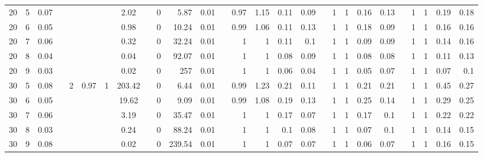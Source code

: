 \documentclass[11pt]{article}
\begin{document}
\begin{table}
\begin{adjustbox}{width=\columnwidth, height=0.3\textheight, center}
\begin{tabular}{rrrrccccrrrrrrrrrrrrrrrrrrr}
			\midrule
			20    & 5     & 0.07  &       &       &       &       & 2.02  &       & 0     & 5.87  & 0.01  &       & 0.97  & 1.15  & 0.11  & 0.09  &       & 1     & 1     & 0.16  & 0.13  &       & 1     & 1     & 0.19  & 0.18 \\
			20    & 6     & 0.05  &       &       &       &       & 0.98  &       & 0     & 10.24 & 0.01  &       & 0.99  & 1.06  & 0.11  & 0.13  &       & 1     & 1     & 0.18  & 0.09  &       & 1     & 1     & 0.16  & 0.16 \\
			20    & 7     & 0.06  &       &       &       &       & 0.32  &       & 0     & 32.24 & 0.01  &       & 1     & 1     & 0.11  & 0.1   &       & 1     & 1     & 0.09  & 0.09  &       & 1     & 1     & 0.14  & 0.16 \\
			20    & 8     & 0.04  &       &       &       &       & 0.04  &       & 0     & 92.07 & 0.01  &       & 1     & 1     & 0.08  & 0.09  &       & 1     & 1     & 0.08  & 0.08  &       & 1     & 1     & 0.11  & 0.13 \\
			20    & 9     & 0.03  &       &       &       &       & 0.02  &       & 0     & 257   & 0.01  &       & 1     & 1     & 0.06  & 0.04  &       & 1     & 1     & 0.05  & 0.07  &       & 1     & 1     & 0.07  & 0.1 \\
			\midrule
			30    & 5     & 0.08  &       & 2     & 0.97  & 1     & 203.42  &       & 0     & 6.44  & 0.01  &       & 0.99  & 1.23  & 0.21  & 0.11  &       & 1     & 1     & 0.21  & 0.21  &       & 1     & 1     & 0.45  & 0.27 \\
			30    & 6     & 0.05  &       &       &       &       & 19.62  &       & 0     & 9.09  & 0.01  &       & 0.99  & 1.08  & 0.19  & 0.13  &       & 1     & 1     & 0.25  & 0.14  &       & 1     & 1     & 0.29  & 0.25 \\
			30    & 7     & 0.06  &       &       &       &       & 3.19  &       & 0     & 35.47 & 0.01  &       & 1     & 1     & 0.17  & 0.07  &       & 1     & 1     & 0.17  & 0.1   &       & 1     & 1     & 0.22  & 0.22 \\
			30    & 8     & 0.03  &       &       &       &       & 0.24  &       & 0     & 88.24 & 0.01  &       & 1     & 1     & 0.1   & 0.08  &       & 1     & 1     & 0.07  & 0.1   &       & 1     & 1     & 0.14  & 0.15 \\
			30    & 9     & 0.08  &       &       &       &       & 0.02  &       & 0     & 239.54 & 0.01  &       & 1     & 1     & 0.07  & 0.07  &       & 1     & 1     & 0.06  & 0.07  &       & 1     & 1     & 0.16  & 0.15 \\

\end{tabular}
\end{adjustbox}
\end{table}
\end{document}
